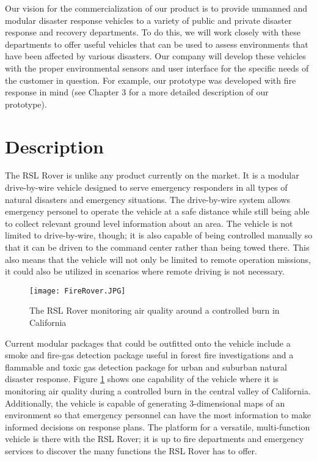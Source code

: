 Our vision for the commercialization of our product is to provide unmanned and modular disaster response vehicles to a variety of public and private disaster response and recovery departments. To do this, we will work closely with these departments to offer useful vehicles that can be used to assess environments that have been affected by various disasters. Our company will develop these vehicles with the proper environmental sensors and user interface for the specific needs of the customer in question. For example, our prototype was developed with fire response in mind (see Chapter 3 for a more detailed description of our prototype). 

\section{Description}

The RSL Rover is unlike any product currently on the market. It is a modular drive-by-wire vehicle designed to serve emergency responders in all types of natural disasters and emergency situations. The drive-by-wire system allows emergency personel to operate the vehicle at a safe distance while still being able to collect relevant ground level information about an area. The vehicle is not limited to drive-by-wire, though; it is also capable of being controlled manually so that it can be driven to the command center rather than being towed there. This also means that the vehicle will not only be limited to remote operation missions, it could also be utilized in scenarios where remote driving is not necessary.\newline

\begin{figure}[h!]
	\begin{center}
		\texttt{[image: FireRover.JPG]}
		\caption{The RSL Rover monitoring air quality around a controlled burn in California}
		\label{fig:FireRover}
	\end{center}
\end{figure}

Current modular packages that could be outfitted onto the vehicle include a smoke and fire-gas detection package useful in forest fire investigations and a flammable and toxic gas detection package for urban and suburban natural disaster response. Figure \ref{fig:FireRover} shows one capability of the vehicle where it is monitoring air quality during a controlled burn in the central valley of California. Additionally, the vehicle is capable of generating 3-dimensional maps of an environment so that emergency personnel can have the most information to make informed decisions on response plans. The platform for a versatile, multi-function vehicle is there with the RSL Rover; it is up to fire departments and emergency services to discover the many functions the RSL Rover has to offer.

